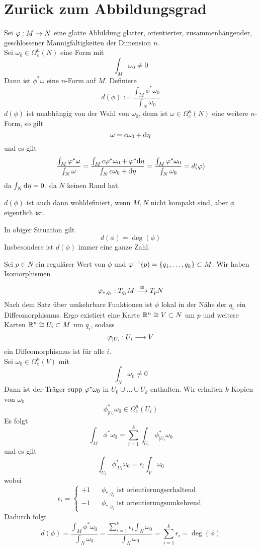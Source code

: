 \section{Zurück zum Abbildungsgrad}
\Def{}
Sei $\varphi : M \overset{}{\rightarrow} N$ eine glatte Abbildung glatter, orientierter, zusammenhängender, geschlossener Mannigfaltigkeiten der Dimension $n$.\\
Sei $\omega_0 \in \Omega^n_c(N)$ eine Form mit
\[ \int_M \omega_0 \neq 0 \]
Dann ist $\phi^* \omega$ eine $n$-Form auf $M$. Definiere
\[ d(\phi) := \frac{\int_{M}\phi^*\omega_0}{\int_N\omega_0} \]
$d(\phi)$ ist unabhängig von der Wahl von $\omega_0$, denn ist $\omega \in \Omega^n_c(N)$ eine weitere $n$-Form, so gilt
\[ \omega = c \omega_0 + \text{d} \eta \]
und es gilt
\[ \frac{\int_M \varphi^*\omega }{\int_N \omega} = \frac{\int_M c\varphi^*\omega_0 + \varphi^*\text{d} \eta}{\int_N c \omega_0 + \text{d} \eta} = \frac{\int_M \varphi^*\omega_0}{\int_N\omega_0} = d(\varphi) \]
da $\int_N \text{d} \eta= 0$, da $N$ keinen Rand hat.

\Bem{}
$d(\phi)$ ist auch dann wohldefiniert, wenn $M,N$ nicht kompakt sind, aber $\phi$ eigentlich ist.

\Satz{}
In obiger Situation gilt
\[ d( \phi) = \deg (\phi) \]
Insbesondere ist $d(\phi)$ immer eine ganze Zahl.
\begin{Beweis}{}
	Sei $p \in N$ ein regulärer Wert von $\phi$ und $\varphi^{-1}(p) = \{q_1, \ldots, q_k\} \subset M$. Wir haben Isomorphismen
	\[ \varphi_{*,q_i} : T_{q_i}M \overset{\overset{}{\cong}}{\longrightarrow} T_pN \]
	Nach dem Satz über umkehrbare Funktionen ist $\phi$ lokal in der Nähe der $q_i$ ein Diffeomorphismus. Ergo existiert eine Karte $\mathbb{R}^n \overset{}{\cong} V\subset N$ um $p$ und weitere Karten $\mathbb{R}^n \overset{}{\cong} U_i \subset M$ um $q_i$, sodass
	\[ \varphi_{|U_i} : U_i \overset{}{\longrightarrow} V \]
	ein Diffeomorphismus ist für alle $i$.\\
	Sei $\omega_0 \in \Omega_c^n(V)$ mit
	\[ \int_N \omega_0 \neq 0 \]
	Dann ist der Träger $\supp\ \phi^*\omega_0$ in $U_0 \cup \ldots \cup U_k$ enthalten. Wir erhalten $k$ Kopien von $\omega_0$
	\[ \phi^*_{|U_i}\omega_0 \in \Omega_c^n(U_i) \]
	Es folgt
	\[ \int_M \phi^*\omega_0 =
	\sum_{i=1}^k\int_{U_i} \phi^*_{|U_i}\omega_0 \]
	und es gilt
	\[\int_{U_i} \phi^*_{|U_i}\omega_0 = \epsilon_i \int_V \omega_0 \]
	wobei
	\[ \epsilon_i = \left\lbrace
	\begin{aligned}
	+1 && \phi_{*,q_i} \text{ ist orientierungserhaltend}\\
	-1 && \phi_{*,q_i} \text{ ist orientierungsumkehrend}
	\end{aligned}
	\right. \]
	Dadurch folgt
	\[ d(\phi) = \frac{\int_M \phi^*\omega_0 }{ \int_N \omega_0 }
	= \frac{\sum_{i=1}^k\epsilon_i \int_N \omega_0}{\int_N \omega_0} = \sum_{i=1}^k\epsilon_i  = \deg(\phi)
	 \]
\end{Beweis}

